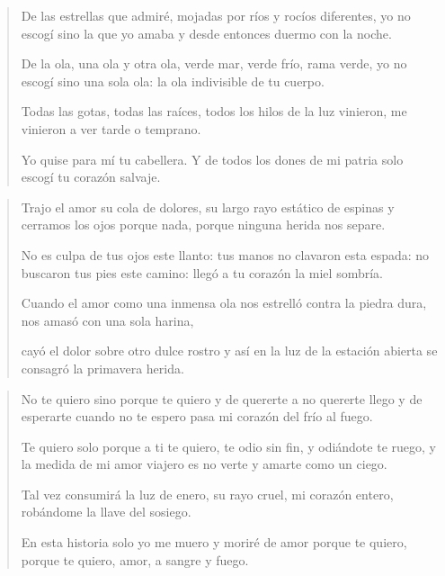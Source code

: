 \documentclass[12pt]{article}
\begin{document}
\clearpage
{}
\begin{verse}
De las estrellas que admiré, mojadas  
por ríos y rocíos diferentes,  
yo no escogí sino la que yo amaba  
y desde entonces duermo con la noche.  

De la ola, una ola y otra ola,  
verde mar, verde frío, rama verde,  
yo no escogí sino una sola ola:  
la ola indivisible de tu cuerpo.  

Todas las gotas, todas las raíces,  
todos los hilos de la luz vinieron,  
me vinieron a ver tarde o temprano.  

Yo quise para mí tu cabellera.  
Y de todos los dones de mi patria  
solo escogí tu corazón salvaje.  

\end{verse}

\clearpage
{}
\begin{verse}
Trajo el amor su cola de dolores,  
su largo rayo estático de espinas  
y cerramos los ojos porque nada,  
porque ninguna herida nos separe.  

No es culpa de tus ojos este llanto:  
tus manos no clavaron esta espada:  
no buscaron tus pies este camino:  
llegó a tu corazón la miel sombría.  

Cuando el amor como una inmensa ola  
nos estrelló contra la piedra dura,  
nos amasó con una sola harina,  

cayó el dolor sobre otro dulce rostro  
y así en la luz de la estación abierta  
se consagró la primavera herida.  

\end{verse}

\clearpage
{}
\begin{verse}
No te quiero sino porque te quiero  
y de quererte a no quererte llego  
y de esperarte cuando no te espero  
pasa mi corazón del frío al fuego.  

Te quiero solo porque a ti te quiero,  
te odio sin fin, y odiándote te ruego,  
y la medida de mi amor viajero  
es no verte y amarte como un ciego.  

Tal vez consumirá la luz de enero,  
su rayo cruel, mi corazón entero,  
robándome la llave del sosiego.  

En esta historia solo yo me muero  
y moriré de amor porque te quiero,  
porque te quiero, amor, a sangre y fuego.  

\end{verse}
\end{document}
